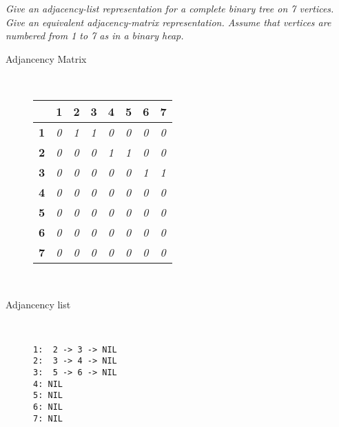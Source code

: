 \begin{problem}
\textit{Give an adjacency-list representation for a complete binary tree on 7 vertices. Give
an equivalent adjacency-matrix representation. Assume that vertices are numbered
from 1 to 7 as in a binary heap.}

\begin{solution}

\begin{description}

\item [Adjancency Matrix]\hfill \\
\begin{tabular}{|l|l|l|l|l|l|l|l|}
\hline
\textbf{}  & \textbf{1} & \textbf{2} & \textbf{3} & \textbf{4} & \textbf{5} & \textbf{6} & 7          \\ \hline
\textbf{1} & \textit{0} & \textit{1} & \textit{1} & \textit{0} & \textit{0} & \textit{0} & \textit{0} \\ \hline
\textbf{2} & \textit{0} & \textit{0} & \textit{0} & \textit{1} & \textit{1} & \textit{0} & \textit{0} \\ \hline
\textbf{3} & \textit{0} & \textit{0} & \textit{0} & \textit{0} & \textit{0} & \textit{1} & \textit{1} \\ \hline
\textbf{4} & \textit{0} & \textit{0} & \textit{0} & \textit{0} & \textit{0} & \textit{0} & \textit{0} \\ \hline
\textbf{5} & \textit{0} & \textit{0} & \textit{0} & \textit{0} & \textit{0} & \textit{0} & \textit{0} \\ \hline
\textbf{6} & \textit{0} & \textit{0} & \textit{0} & \textit{0} & \textit{0} & \textit{0} & \textit{0} \\ \hline
\textbf{7} & \textit{0} & \textit{0} & \textit{0} & \textit{0} & \textit{0} & \textit{0} & \textit{0} \\ \hline
\end{tabular}
\hfill \\
\item [Adjancency list] \hfill \\
\begin{verbatim}
1:  2 -> 3 -> NIL
2:  3 -> 4 -> NIL
3:  5 -> 6 -> NIL
4: NIL
5: NIL
6: NIL
7: NIL
\end{verbatim}
\end{description}
\end{solution}
\end{problem}

